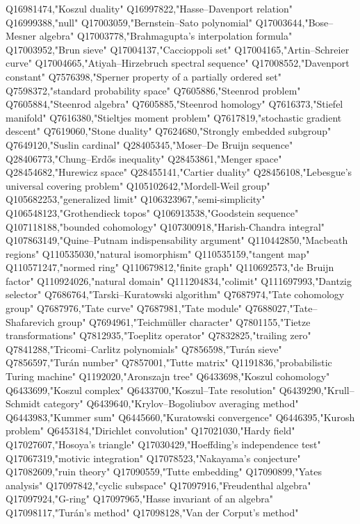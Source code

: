 Q16981474,"Koszul duality"
Q16997822,"Hasse–Davenport relation"
Q16999388,"null"
Q17003059,"Bernstein–Sato polynomial"
Q17003644,"Bose–Mesner algebra"
Q17003778,"Brahmagupta's interpolation formula"
Q17003952,"Brun sieve"
Q17004137,"Caccioppoli set"
Q17004165,"Artin–Schreier curve"
Q17004665,"Atiyah–Hirzebruch spectral sequence"
Q17008552,"Davenport constant"
Q7576398,"Sperner property of a partially ordered set"
Q7598372,"standard probability space"
Q7605886,"Steenrod problem"
Q7605884,"Steenrod algebra"
Q7605885,"Steenrod homology"
Q7616373,"Stiefel manifold"
Q7616380,"Stieltjes moment problem"
Q7617819,"stochastic gradient descent"
Q7619060,"Stone duality"
Q7624680,"Strongly embedded subgroup"
Q7649120,"Suslin cardinal"
Q28405345,"Moser–De Bruijn sequence"
Q28406773,"Chung–Erdős inequality"
Q28453861,"Menger space"
Q28454682,"Hurewicz space"
Q28455141,"Cartier duality"
Q28456108,"Lebesgue's universal covering problem"
Q105102642,"Mordell-Weil group"
Q105682253,"generalized limit"
Q106323967,"semi-simplicity"
Q106548123,"Grothendieck topos"
Q106913538,"Goodstein sequence"
Q107118188,"bounded cohomology"
Q107300918,"Harish-Chandra integral"
Q107863149,"Quine–Putnam indispensability argument"
Q110442850,"Macbeath regions"
Q110535030,"natural isomorphism"
Q110535159,"tangent map"
Q110571247,"normed ring"
Q110679812,"finite graph"
Q110692573,"de Bruijn factor"
Q110924026,"natural domain"
Q111204834,"colimit"
Q111697993,"Dantzig selector"
Q7686764,"Tarski–Kuratowski algorithm"
Q7687974,"Tate cohomology group"
Q7687976,"Tate curve"
Q7687981,"Tate module"
Q7688027,"Tate–Shafarevich group"
Q7694961,"Teichmüller character"
Q7801155,"Tietze transformations"
Q7812935,"Toeplitz operator"
Q7832825,"trailing zero"
Q7841288,"Tricomi–Carlitz polynomials"
Q7856598,"Turán sieve"
Q7856597,"Turán number"
Q7857001,"Tutte matrix"
Q1191836,"probabilistic Turing machine"
Q1192020,"Aronszajn tree"
Q6433698,"Koszul cohomology"
Q6433699,"Koszul complex"
Q6433700,"Koszul–Tate resolution"
Q6439290,"Krull–Schmidt category"
Q6439640,"Krylov–Bogoliubov averaging method"
Q6443983,"Kummer sum"
Q6445660,"Kuratowski convergence"
Q6446395,"Kurosh problem"
Q6453184,"Dirichlet convolution"
Q17021030,"Hardy field"
Q17027607,"Hosoya's triangle"
Q17030429,"Hoeffding's independence test"
Q17067319,"motivic integration"
Q17078523,"Nakayama's conjecture"
Q17082609,"ruin theory"
Q17090559,"Tutte embedding"
Q17090899,"Yates analysis"
Q17097842,"cyclic subspace"
Q17097916,"Freudenthal algebra"
Q17097924,"G-ring"
Q17097965,"Hasse invariant of an algebra"
Q17098117,"Turán's method"
Q17098128,"Van der Corput's method"
